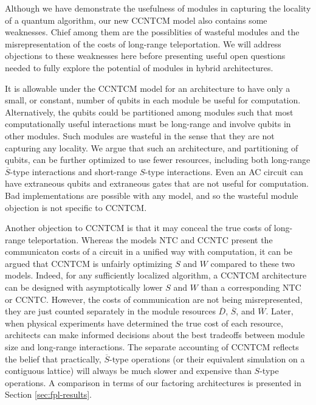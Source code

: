 Although we have demonstrate the usefulness of modules in capturing
the locality of a quantum algorithm, our new \textsf{CCNTCM} model also
contains some weaknesses. Chief among them are the possiblities of
wasteful modules
and the misrepresentation of the costs of long-range teleportation. We will
address objections to these weaknesses here before presenting useful
open questions needed to fully explore the potential of modules in
hybrid architectures.

It is allowable under the \textsf{CCNTCM} model for an architecture
to have only a small,
or constant, number of qubits in each module be useful for computation.
Alternatively, the qubits could be partitioned among modules such that most
computationally useful interactions must be long-range and involve
qubits in other modules.
Such modules are wasteful in the sense that they are not capturing any
locality.
We argue that such an architecture, and partitioning of qubits, can be
further optimized to use fewer resources, including both long-range
$\overline{S}$-type interactions and short-range $S$-type interactions.
Even an \textsf{AC} circuit can have extraneous
qubits and extraneous gates that are not useful for computation.
Bad implementations are possible with any model, and so the wasteful module
objection is not specific to \textsf{CCNTCM}.

Another objection to \textsf{CCNTCM} is that it may conceal the true
costs of long-range teleportation. Whereas the models \textsf{NTC} and
\textsf{CCNTC} present the communicaton costs of a circuit in a unified
way with computation, it can be argued that \textsf{CCNTCM} is unfairly
optimizing $S$ and $W$ compared to these two models. Indeed, for any
sufficiently localized algorithm, a \textsf{CCNTCM} architecture can be designed with asymptotically lower $S$ and $W$ than a corresponding \textsf{NTC} or \textsf{CCNTC}. However, the costs of communication are not being
misrepresented, they are just counted separately
in the module resources $\overline{D}$, $\overline{S}$, and
$\overline{W}$. Later, when physical experiments have determined the
true cost of each resource, architects can make informed decisions about
the best tradeoffs between module size and long-range interactions.
The separate accounting of \textsf{CCNTCM} reflects the belief that
practically, $\overline{S}$-type operations (or their equivalent simulation
on a contiguous lattice) will always be much slower
and expensive than $S$-type operations. A comparison in terms of our
factoring architectures is presented in Section \ref{sec:fpl-results}.


